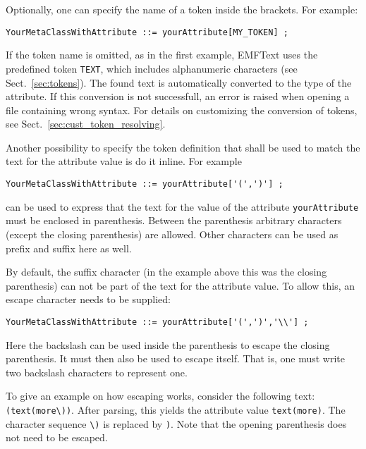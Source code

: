 Optionally, one can specify the name of a token inside the brackets. For example:

\lstset{language=CS}
\begin{lstlisting}
YourMetaClassWithAttribute ::= yourAttribute[MY_TOKEN] ;
\end{lstlisting}

If the token name is omitted, as in the first example, EMFText uses the 
predefined token \texttt{TEXT}, which includes alphanumeric characters (see 
Sect.~\ref{sec:tokens}). The
found text is automatically converted to the type of the attribute. If this 
conversion is not successfull, an error is raised when opening a file containing 
wrong syntax. For details on customizing the conversion of tokens, see
Sect.~\ref{sec:cust_token_resolving}.

Another possibility to specify the token definition that shall be used to match 
the text for the attribute value is do it inline. For example

\lstset{language=CS}
\begin{lstlisting}
YourMetaClassWithAttribute ::= yourAttribute['(',')'] ;
\end{lstlisting}

can be used to express that the text for the value of the attribute
\texttt{yourAttribute} must be enclosed in parenthesis. Between the parenthesis 
arbitrary characters (except the closing 
parenthesis) are allowed. Other characters can be used as prefix and suffix here as 
well.

By default, the suffix character (in the example above this was the closing 
parenthesis) can not be part of the text for the attribute value. To allow this, 
an escape character needs to be supplied:

\lstset{language=CS}
\begin{lstlisting}
YourMetaClassWithAttribute ::= yourAttribute['(',')','\\'] ;
\end{lstlisting}

Here the backslash can be used inside the parenthesis to escape the closing 
parenthesis. It must then also be used to escape itself. That is, one must
write two backslash characters to represent one. 

To give an example on how escaping works, consider the following text:
\texttt{(text(more\textbackslash{}))}. After parsing, this yields the attribute
value \texttt{text(more)}. The character sequence \texttt{\textbackslash{})} is
replaced by \texttt{)}. Note that the opening parenthesis does not need to be
escaped.

